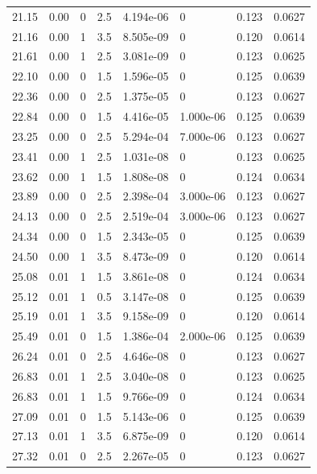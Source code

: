 \documentclass[preview]{standalone}
\begin{document}
{{{\begin{tabular}{L{1.2cm}C{1.2cm} C{0.3cm}C{0.5cm} C{1.4cm}C{1.4cm} C{1.4cm}C{1.4cm}}
  21.15  &  0.00  & 0     & 2.5 &  4.194e-06  & 0  & 0.123 &  0.0627   \\ 
  21.16  &  0.00  & 1     & 3.5 &  8.505e-09  & 0  & 0.120 &  0.0614   \\ 
  21.61  &  0.00  & 1     & 2.5 &  3.081e-09  & 0  & 0.123 &  0.0625   \\ 
  22.10  &  0.00  & 0     & 1.5 &  1.596e-05  & 0  & 0.125 &  0.0639   \\ 
  22.36  &  0.00  & 0     & 2.5 &  1.375e-05  & 0  & 0.123 &  0.0627   \\ 
  22.84  &  0.00  & 0     & 1.5 &  4.416e-05  & 1.000e-06  & 0.125 &  0.0639   \\ 
  23.25  &  0.00  & 0     & 2.5 &  5.294e-04  & 7.000e-06  & 0.123 &  0.0627   \\ 
  23.41  &  0.00  & 1     & 2.5 &  1.031e-08  & 0  & 0.123 &  0.0625   \\ 
  23.62  &  0.00  & 1     & 1.5 &  1.808e-08  & 0  & 0.124 &  0.0634   \\ 
  23.89  &  0.00  & 0     & 2.5 &  2.398e-04  & 3.000e-06  & 0.123 &  0.0627   \\ 
  24.13  &  0.00  & 0     & 2.5 &  2.519e-04  & 3.000e-06  & 0.123 &  0.0627   \\ 
  24.34  &  0.00  & 0     & 1.5 &  2.343e-05  & 0  & 0.125 &  0.0639   \\ 
  24.50  &  0.00  & 1     & 3.5 &  8.473e-09  & 0  & 0.120 &  0.0614   \\ 
  25.08  &  0.01  & 1     & 1.5 &  3.861e-08  & 0  & 0.124 &  0.0634   \\ 
  25.12  &  0.01  & 1     & 0.5 &  3.147e-08  & 0  & 0.125 &  0.0639   \\ 
  25.19  &  0.01  & 1     & 3.5 &  9.158e-09  & 0  & 0.120 &  0.0614   \\ 
  25.49  &  0.01  & 0     & 1.5 &  1.386e-04  & 2.000e-06  & 0.125 &  0.0639   \\ 
  26.24  &  0.01  & 0     & 2.5 &  4.646e-08  & 0  & 0.123 &  0.0627   \\ 
  26.83  &  0.01  & 1     & 2.5 &  3.040e-08  & 0  & 0.123 &  0.0625   \\ 
  26.83  &  0.01  & 1     & 1.5 &  9.766e-09  & 0  & 0.124 &  0.0634   \\ 
  27.09  &  0.01  & 0     & 1.5 &  5.143e-06  & 0  & 0.125 &  0.0639   \\ 
  27.13  &  0.01  & 1     & 3.5 &  6.875e-09  & 0  & 0.120 &  0.0614   \\ 
  27.32  &  0.01  & 0     & 2.5 &  2.267e-05  & 0  & 0.123 &  0.0627   \\ 

\end{tabular}}}}
\end{document}
